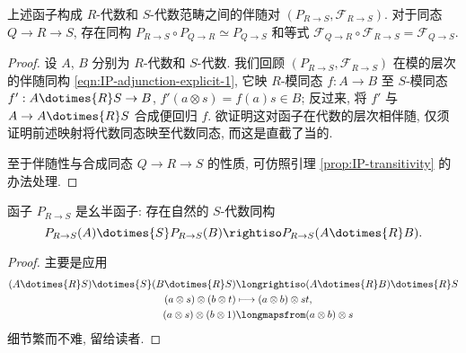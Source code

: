 \begin{proposition}\label{prop:IP-vs-F-alg}
	上述函子构成 $R$-代数和 $S$-代数范畴之间的伴随对 $(P_{R \to S}, \mathcal{F}_{R \to S})$. 对于同态 $Q \to R \to S$, 存在同构 $P_{R \to S} \circ P_{Q \to R} \simeq P_{Q \to S}$ 和等式 $\mathcal{F}_{Q \to R} \circ \mathcal{F}_{R \to S} = \mathcal{F}_{Q \to S}$.
\end{proposition}
\begin{proof}
	设 $A$, $B$ 分别为 $R$-代数和 $S$-代数.	我们回顾 $(P_{R \to S}, \mathcal{F}_{R \to S})$ 在模的层次的伴随同构 \eqref{eqn:IP-adjunction-explicit-1}, 它映 $R$-模同态 $f: A \to B$ 至 $S$-模同态 $f': A \dotimes{R} S \to B$, $f'(a \otimes s) = f(a)s \in B$; 反过来, 将 $f'$ 与 $A \to A \dotimes{R} S$ 合成便回归 $f$. 欲证明这对函子在代数的层次相伴随, 仅须证明前述映射将代数同态映至代数同态, 而这是直截了当的.
	
	至于伴随性与合成同态 $Q \to R \to S$ 的性质, 可仿照引理 \ref{prop:IP-transitivity} 的办法处理.
\end{proof}

\begin{proposition}\label{prop:algebra-base-change-monoidal}
	函子 $P_{R \to S}$ 是幺半函子: 存在自然的 $S$-代数同构
	\[ P_{R \to S}(A) \dotimes{S} P_{R \to S}(B) \rightiso P_{R \to S}(A \dotimes{R} B). \]
\end{proposition}
\begin{proof}
	主要是应用
	\begin{align*}
		(A \dotimes{R} S) \dotimes{S} (B \dotimes{R} S) & \longrightiso (A \dotimes{R} B) \dotimes{R} S \\
		(a \otimes s) \otimes (b \otimes t) & \longmapsto (a \otimes b) \otimes st, \\
		(a \otimes s) \otimes (b \otimes 1) & \longmapsfrom (a \otimes b) \otimes s
	\end{align*}
	细节繁而不难, 留给读者.
\end{proof}

